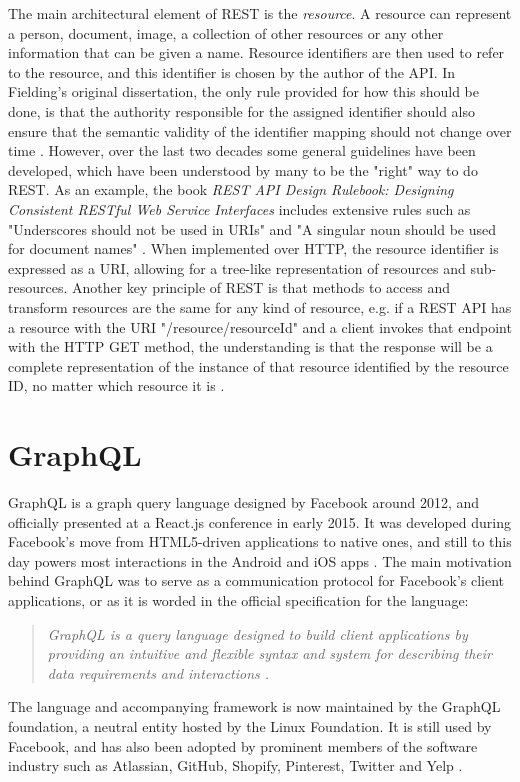 The main architectural element of REST is the \textit{resource}. A resource can represent a person, document, image, a collection of other resources or any other information that can be given a name. Resource identifiers are then used to refer to the resource, and this identifier is chosen by the author of the API. In Fielding's original dissertation, the only rule provided for how this should be done, is that the authority responsible for the assigned identifier should also ensure that the semantic validity of the identifier mapping should not change over time \cite{fielding2000architectural}. However, over the last two decades some general guidelines have been developed, which have been understood by many to be the "right" way to do REST. As an example, the book \textit{REST API Design Rulebook: Designing Consistent RESTful Web Service Interfaces} includes extensive rules such as "Underscores should not be used in URIs" and "A singular noun should be used for document names" \cite{masse2011rest}. When implemented over HTTP, the resource identifier is expressed as a URI, allowing for a tree-like representation of resources and sub-resources. Another key principle of REST is that methods to access and transform resources are the same for any kind of resource, e.g. if a REST API has a resource with the URI "/resource/{resourceId}" and a client invokes that endpoint with the HTTP GET method, the understanding is that the response will be a complete representation of the instance of that resource identified by the resource ID, no matter which resource it is \cite{fielding2017reflections}.

\section{GraphQL}
GraphQL is a graph query language designed by Facebook around 2012, and officially presented at a React.js conference in early 2015. It was developed during Facebook's move from HTML5-driven applications to native ones, and still to this day powers most interactions in the Android and iOS apps \cite{schrock2015blog}. The main motivation behind GraphQL was to serve as a communication protocol for Facebook's client applications, or as it is worded in the official specification for the language:
\begin{quote}
\textit{
    GraphQL is a query language designed to build client applications by providing an intuitive and flexible syntax and system for describing their data requirements and interactions \cite{graphql2018spec}.}
\end{quote}
The language and accompanying framework is now maintained by the GraphQL foundation, a neutral entity hosted by the Linux Foundation. It is still used by Facebook, and has also been adopted by prominent members of the software industry such as Atlassian, GitHub, Shopify, Pinterest, Twitter and Yelp \cite{graphqlusers}.

